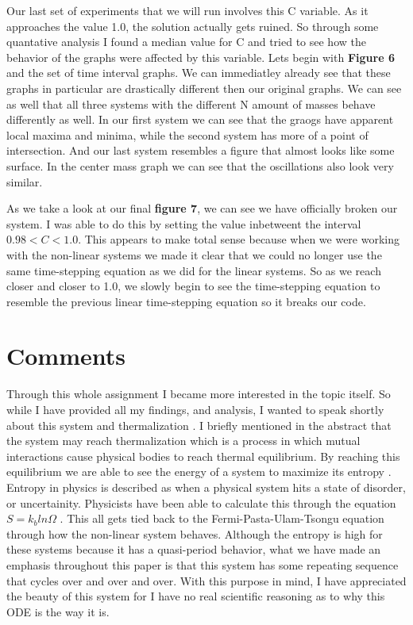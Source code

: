 Our last set of experiments that we will run involves this C variable. As it approaches the value 1.0, the solution actually gets ruined. So through some quantative analysis I found a median value for C and tried to see how the behavior of the graphs were affected by this variable. Lets begin with \textbf{Figure 6} and the set of time interval graphs. We can immediatley already see that these graphs in particular are drastically different then our original graphs. We can see as well that all three systems with the different N amount of masses behave differently as well. In our first system we can see that the graogs have apparent local maxima and minima, while the second system has more of a point of intersection. And our last system resembles a figure that almost looks like some surface. In the center mass graph we can see that the oscillations also look very similar. 

As we take a look at our final \textbf{figure 7}, we can see we have officially broken our system. I was able to do this by setting the value inbetweent the interval $0.98 < C < 1.0$. This appears to make total sense because when we were working with the non-linear systems we made it clear that we could no longer use the same time-stepping equation as we did for the linear systems. So as we reach closer and closer to 1.0, we slowly begin to see the time-stepping equation to resemble the previous linear time-stepping equation so it breaks our code. 

\section{Comments}

Through this whole assignment I became more interested in the topic itself. So while I have provided all my findings, and analysis, I wanted to speak shortly about this system and thermalization \cite{therm}. I briefly mentioned in the abstract that the system may reach thermalization which is a process in which mutual interactions cause physical bodies to reach thermal equilibrium. By reaching this equilibrium we are able to see the energy of a system to maximize its entropy \cite{therm2}. Entropy in physics is described as when a physical system hits a state of disorder, or uncertainity. Physicists have been able to calculate this through the equation $S = k_{b} ln \Omega$ \cite{entropy}. This all gets tied back to the Fermi-Pasta-Ulam-Tsongu equation through how the non-linear system behaves. Although the entropy is high for these systems because it has a quasi-period behavior, what we have made an emphasis throughout this paper is that this system has some repeating sequence that cycles over and over and over. With this purpose in mind, I have appreciated the beauty of this system for I have no real scientific reasoning as to why this ODE is the way it is.


